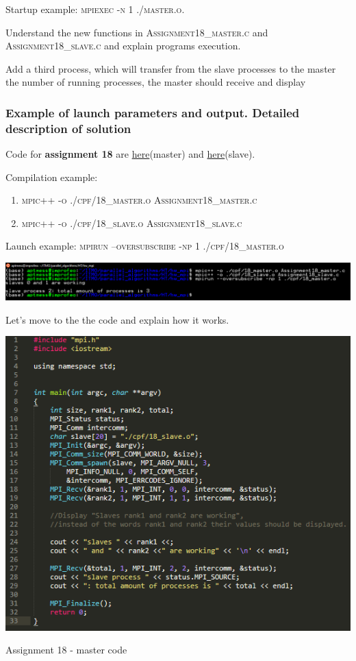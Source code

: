 \documentclass[%
12pt, %
final, %
oneside, %
onecolumn, %
centertags]{article} %
\theoremstyle{plain}
\theoremstyle{definition}
\theoremstyle{remark}
\begin{document}
Startup example: \textsc{mpiexec -n 1 ./master.o}.

Understand the new functions in \textsc{Assignment18\_master.c} and \textsc{Assignment18\_slave.c} and explain programs 
execution.

Add a third process, which will transfer from the slave processes to the master the number of running 
processes, the master should receive and display


\subsubsection{Example of launch parameters and output. Detailed description of solution}

Code for \textbf{assignment 18} are \href{https:\//github.com/aptmess/parallel_algorithms/blob/master/HT/hw_mpi/Assignment18_master.c}{here}(master) and \href{https:\//github.com/aptmess/parallel_algorithms/blob/master/HT/hw_mpi/Assignment18_slave.c}{here}(slave).

Compilation example: 

\begin{enumerate}
	\item \textsc{mpic++ -o ./cpf/18\_master.o Assignment18\_master.c}
	\item \textsc{mpic++ -o ./cpf/18\_slave.o Assignment18\_slave.c}
\end{enumerate}

Launch example: \textsc{mpirun --oversubscribe -np 1 ./cpf/18\_master.o}

\begin{center}
\includegraphics[scale=0.5]{18.png}
\end{center}

Let's move to the the code and explain how it works.

\begin{center}
\includegraphics[scale=1.1]{18.master.code.png}

Assignment 18 - master code
\end{center}
\end{document}
